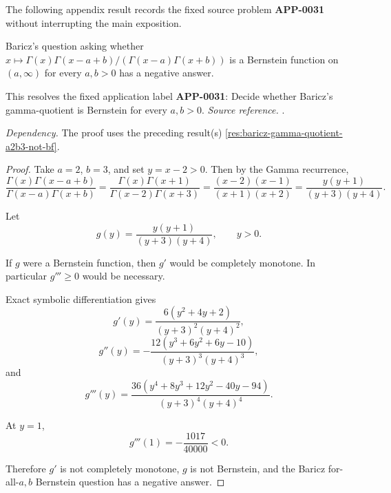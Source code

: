 The following appendix result records the fixed source problem \textbf{APP-0031} \cite{baricz-turan} without interrupting the main exposition.
\begin{counterexample}
\label{res:baricz-gamma-quotient-bf-forall-negative-answer}
Baricz's question asking whether \(x\mapsto\Gamma(x)\Gamma(x-a+b)/(\Gamma(x-a)\Gamma(x+b))\) is a Bernstein function on \((a,\infty)\) for every \(a,b>0\) has a negative answer.

This resolves the fixed application label \textbf{APP-0031}: Decide whether Baricz's gamma-quotient is Bernstein for every \(a,b>0\).
\emph{Source reference.} \cite{baricz-turan}.

\emph{Dependency.} The proof uses the preceding result(s) \ref{res:baricz-gamma-quotient-a2b3-not-bf}.
\end{counterexample}
\begin{proof}
Take \(a=2\), \(b=3\), and set \(y=x-2>0\). Then by the Gamma recurrence,
\[
\frac{\Gamma(x)\Gamma(x-a+b)}{\Gamma(x-a)\Gamma(x+b)}
=\frac{\Gamma(x)\Gamma(x+1)}{\Gamma(x-2)\Gamma(x+3)}
=\frac{(x-2)(x-1)}{(x+1)(x+2)}
=\frac{y(y+1)}{(y+3)(y+4)}.
\]

Let
\[
g(y)=\frac{y(y+1)}{(y+3)(y+4)},\qquad y>0.
\]

If \(g\) were a Bernstein function, then \(g'\) would be completely monotone. In particular \(g'''\ge0\) would be necessary.

Exact symbolic differentiation gives
\[
g'(y)=\frac{6(y^2+4y+2)}{(y+3)^2(y+4)^2},
\]
\[
g''(y)=
-\frac{12(y^3+6y^2+6y-10)}{(y+3)^3(y+4)^3},
\]
and
\[
g'''(y)=
\frac{36(y^4+8y^3+12y^2-40y-94)}{(y+3)^4(y+4)^4}.
\]

At \(y=1\),
\[
g'''(1)=-\frac{1017}{40000}<0.
\]

Therefore \(g'\) is not completely monotone, \(g\) is not Bernstein, and the Baricz for-all-\(a,b\) Bernstein question has a negative answer.
\end{proof}

